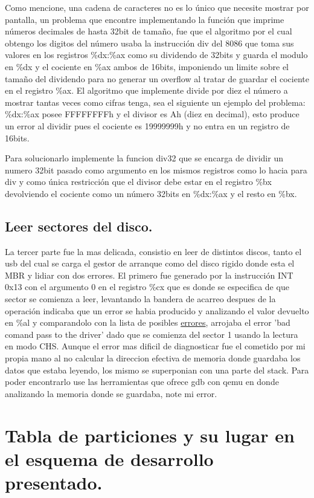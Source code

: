\documentclass[10pt,oneside,a4paper]{article}
\begin{document}
Como mencione, una cadena de caracteres no es lo único que necesite
mostrar por pantalla, un problema que encontre
implementando la función que imprime números decimales de hasta 32bit de tamaño,
fue que el algoritmo por el cual obtengo los digitos del número usaba la
instrucción div del 8086 que toma sus valores en los registros
\%dx:\%ax como su dividendo de 32bits y guarda el modulo en \%dx y
el cociente en \%ax ambos de 16bits, imponiendo un limite sobre el tamaño del
dividendo para no generar un overflow al tratar de guardar el cociente
en el registro \%ax.
El algoritmo que implemente divide por diez el número a mostrar tantas veces
como cifras tenga, sea el siguiente un ejemplo del problema:
\%dx:\%ax posee FFFFFFFFh y el divisor es Ah (diez en decimal),
esto produce un error al dividir
pues el cociente es 19999999h y no entra en un registro de 16bits.

Para solucionarlo implemente la funcion div32 que se
encarga de dividir un numero 32bit pasado como argumento en los mismos registros
como lo hacia para div y como única restricción que el divisor debe estar en
el registro \%bx devolviendo el cociente como un número 32bits en \%dx:\%ax
y el resto en \%bx.

\subsection{Leer sectores del disco.}
La tercer parte fue la mas delicada, consistio en leer de distintos discos,
tanto el usb del cual se carga el gestor de arranque como del disco rigido
donde esta el MBR y lidiar con dos errores.
El primero fue generado por la instrucción INT 0x13 con el argumento
0 en el registro \%cx que es donde se especifica de que sector se
comienza a leer, levantando la bandera de acarreo despues de la operación
indicaba que un error se habia producido y 
analizando el valor devuelto en \%al y comparandolo con la lista de posibles
\href{http://www.pelletiernet.com/helppc/int_13-1.html}{errores},
arrojaba el error 'bad comand pass to the driver'
dado que se comienza del sector 1 usando la lectura en modo CHS.
Aunque el error mas dificil de diagnosticar fue el cometido por mi propia mano
al no calcular la direccion efectiva de memoria donde guardaba los datos que
estaba leyendo, los mismo se superponian con una parte del stack.
Para poder encontrarlo use las herramientas que ofrece gdb con qemu
en donde analizando la memoria donde se guardaba, note mi error.

\section{Tabla de particiones y su lugar en el esquema de desarrollo presentado.}
\end{document}
